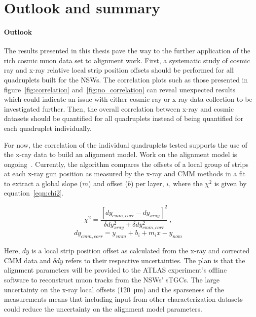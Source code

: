 
\chapter{Outlook and summary}
\label{chap:outlook_and_summary}


\subsubsection*{Outlook}

The results presented in this thesis pave the way to the further application of the rich cosmic muon data set to alignment work.  First, a systematic study of cosmic ray and x-ray relative local strip position offsets should be performed for all quadruplets built for the NSWs. The correlation plots such as those presented in figure~\ref{fig:correlation} and~\ref{fig:no_correlation} can reveal unexpected results which could indicate an issue with either cosmic ray or x-ray data collection to be investigated further. Then, the overall correlation between x-ray and cosmic datasets should be quantified for all quadruplets instead of being quantified for each quadruplet individually.
 
For now, the correlation of the individual quadruplets tested supports the use of the x-ray data to build an alignment model. Work on the alignment model is ongoing~\cite{lefebvre_precision_2020}. Currently, the algorithm compares the offsets of a local group of strips at each x-ray gun position as measured by the x-ray and CMM methods in a fit to extract a global slope ($m$) and offset ($b$) per layer, $i$, where the $\chi^2$ is given by equation~\ref{eqn:chi2}.

\begin{equation}
    \chi^2 = \frac{\left[dy_{cmm, corr} - dy_{xray}\right]^2}{\delta dy_{xray}^2 + \delta dy_{cmm, corr}^2}\:,
    \label{eqn:chi2}  
\end{equation}
\begin{equation}
    dy_{cmm, corr} = y_{cmm} + b_i + m_{i}x - y_{nom}
    \label{eqn:dy_cmm_corr}
\end{equation}

Here, $dy$ is a local strip position offset as calculated from the x-ray and corrected CMM data and $\delta dy$ refers to their respective uncertainties. The plan is that the alignment parameters will be provided to the ATLAS experiment's offline software to reconstruct muon tracks from the NSWs' sTGCs. The large uncertainty on the x-ray local offsets (\SI{120}{\micro\meter}) and the sparseness of the measurements means that including input from other characterization datasets could reduce the uncertainty on the alignment model parameters. 

